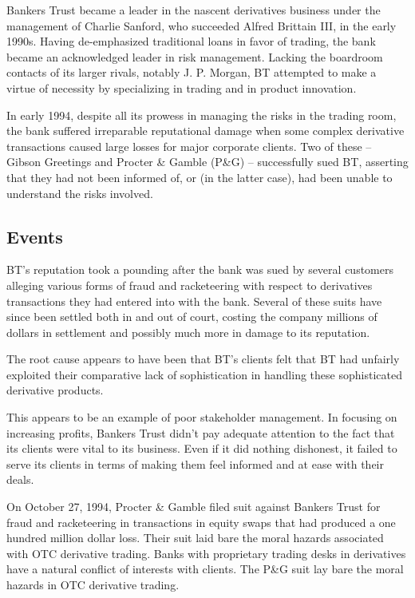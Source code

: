 \documentclass[PRMIA4A.tex]{subfiles}
\begin{document}
Bankers Trust became a leader in the nascent derivatives business under the management of Charlie Sanford, who succeeded Alfred Brittain III, in the early 1990s. Having de-emphasized traditional loans in favor of trading, the bank became an acknowledged leader in risk management. Lacking the boardroom contacts of its larger rivals, notably J. P. Morgan, BT attempted to make a virtue of necessity by specializing in trading and in product innovation.

In early 1994, despite all its prowess in managing the risks in the trading room, the bank suffered irreparable reputational damage when some complex derivative transactions caused large losses for major corporate clients. Two of these -- Gibson Greetings and Procter \& Gamble (P\&G) -- successfully sued BT, asserting that they had not been informed of, or (in the latter case), had been unable to understand the risks involved.
 
\subsection{Events}
BT’s reputation took a pounding after the bank was sued by several customers alleging various forms of fraud and racketeering with respect to derivatives transactions they had entered into with the bank. Several of these suits have since been settled both in and out of court, costing the company millions of dollars in settlement and
possibly much more in damage to its reputation.

The root cause appears to have been that BT’s clients felt that BT had unfairly exploited their comparative lack of sophistication in handling these sophisticated derivative products.

This appears to be an example of poor stakeholder management. In focusing on increasing profits, Bankers Trust didn’t pay adequate attention to the fact that its clients were vital to its business. Even if it did nothing dishonest, it failed to serve its clients in terms of making them feel informed and at ease with their deals.
 

On October 27, 1994, Procter \& Gamble filed suit against Bankers Trust for fraud and racketeering in transactions in equity swaps that had produced a one hundred million dollar loss.
Their suit laid bare the moral hazards associated with OTC derivative trading. Banks with proprietary trading desks in derivatives have a natural conflict of interests with clients.
The P\&G suit lay bare the moral hazards in OTC derivative trading.
\end{document}
